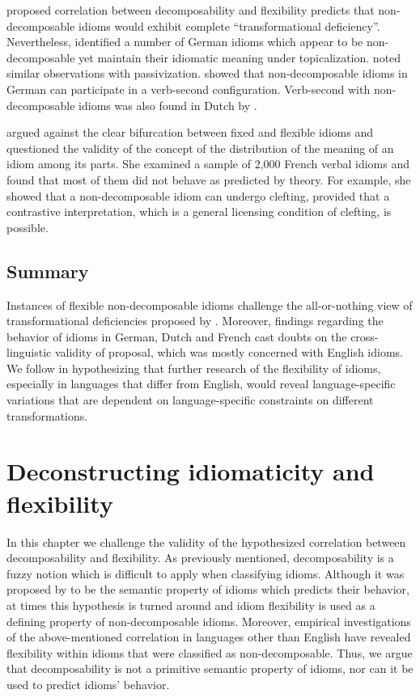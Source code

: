 \documentclass[output=paper]{langsci/langscibook}
\begin{document}
 proposed correlation between decomposability and flexibility predicts that
non-de\-com\-pos\-able idioms would exhibit complete ``transformational
deficiency''. Nevertheless, \citet{webelhuthackerman99} identified a
number of German idioms which appear to be non-decomposable yet
maintain their idiomatic meaning under
topicalization. \citet{bargmannsailer15} noted similar observations with
passivization.  \citet{schenk95} showed that non-decomposable idioms in
German can participate in a verb-second configuration. Verb-second
with non-decomposable idioms was also found in Dutch by
\citet{gregoire:2007:acl07-mwe}.

\citet{abeille95} argued against the clear bifurcation between fixed
and flexible idioms and questioned the validity of the concept of the
distribution of the meaning of an idiom among its parts. She examined
a sample of 2,000 French verbal idioms and found that most of them
did not behave as predicted by  theory. For
example, she showed that a non-decomposable idiom can undergo clefting,
provided that a contrastive interpretation, which is a general
licensing condition of clefting, is possible.

\subsection{Summary}
Instances of flexible non-decomposable idioms challenge the
all-or-nothing view of transformational deficiencies proposed by \citet{nunberg94}. Mo\-reover, findings regarding the behavior of idioms in German, Dutch and French cast doubts on the cross-linguistic validity of  proposal, which was mostly concerned with English idioms. We follow \citet{bargmannsailer15} in hypothesizing that further research of the flexibility of idioms,
especially in languages that differ from English, would reveal
language-specific variations that are dependent on language-specific
constraints on different transformations.

\section{Deconstructing idiomaticity and flexibility}

In this chapter we challenge the validity of the hypothesized correlation between decomposability and flexibility. As previously mentioned, decomposability is a fuzzy notion which is difficult to apply when classifying idioms. Although it was proposed by \citet{nunberg94} to be the semantic property of idioms which predicts their behavior, at times this hypothesis is turned around and idiom flexibility is used as a defining property of non-decomposable idioms. Moreover, empirical investigations of the above-mentioned correlation in languages other than English have revealed flexibility within idioms that were classified as non-decomposable. Thus, we argue that decomposability is not a primitive semantic property of idioms, nor can it be used to predict idioms' behavior.
\end{document}
